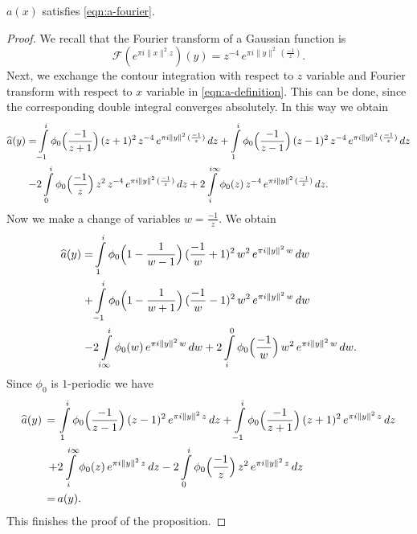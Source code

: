 \begin{proposition}\label{prop:a-fourier}
$a(x)$ satisfies \eqref{eqn:a-fourier}.
\end{proposition}
\begin{proof}
We recall that the Fourier transform of a Gaussian function is
\begin{equation}\label{eqn:gaussian Fourier}
    \mathcal{F}(e^{\pi i \|x\|^2 z})(y)=z^{-4}\,e^{\pi i \|y\|^2 \,(\frac{-1}{z}) }.
\end{equation}
Next, we exchange the contour integration with respect to $z$ variable and Fourier transform with respect to $x$ variable in \eqref{eqn:a-definition}.
This can be done, since the corresponding double integral converges absolutely. In this way we obtain
\begin{align}
    \widehat{a}(y)=&\int\limits_{-1}^i\phi_0\Big(\frac{-1}{z+1}\Big)\,(z+1)^2\,z^{-4}\,e^{\pi i \|y\|^2 \,(\frac{-1}{z})}\,dz
    +\int\limits_{1}^i\phi_0\Big(\frac{-1}{z-1}\Big)\,(z-1)^2\,z^{-4}\,e^{\pi i \|y\|^2 \,(\frac{-1}{z})}\,dz\notag \\
    -&2\int\limits_{0}^i\phi_0\Big(\frac{-1}{z}\Big)\,z^2\,z^{-4}\,e^{\pi i \|y\|^2 \,(\frac{-1}{z})}\,dz +2\int\limits_{i}^{i\infty}\phi_0(z)\,z^{-4}\,e^{\pi i \|y\|^2 \,(\frac{-1}{z})}\,dz.\notag
\end{align}
Now we make a change of variables $w=\frac{-1}{z}$. We obtain
\begin{align}
    \widehat{a}(y)=&\int\limits_{1}^i\phi_0\Big(1-\frac{1}{w-1}\Big)\,(\frac{-1}{w}+1)^2\,w^{2}\,e^{\pi i \|y\|^2 \,w}\,dw\notag\\
    +&\int\limits_{-1}^i\phi_0\Big(1-\frac{1}{w+1}\Big)\,(\frac{-1}{w}-1)^2\,w^2\,e^{\pi i \|y\|^2 \,w}\,dw\\
    -&2\int\limits_{i \infty}^i\phi_0(w)\,e^{\pi i \|y\|^2 \,w}\,dw +2\int\limits_{i}^{0}\phi_0\Big(\frac{-1}{w}\Big)\,w^{2}\,e^{\pi i \|y\|^2 \,w}\,dw.\notag
\end{align}
Since $\phi_0$ is $1$-periodic we have
\begin{align}
    \widehat{a}(y)\,=\,&\int\limits_{1}^i\phi_0\Big(\frac{-1}{z-1}\Big)\,(z-1)^2\,e^{\pi i \|y\|^2 \,z}\,dz
    +\int\limits_{-1}^i\phi_0\Big(\frac{-1}{z+1}\Big)\,(z+1)^2\,e^{\pi i \|y\|^2 \,z}\,dz\notag \\
    +&2\int\limits_{i}^{i\infty}\phi_0(z)\,e^{\pi i \|y\|^2 \,z}\,dz
    -2\int\limits_{0}^{i}\phi_0\Big(\frac{-1}{z}\Big)\,z^{2}\,e^{\pi i \|y\|^2 \,z}\,dz\notag \\
    \,=\,&a(y).
\end{align}
This finishes the proof of the proposition.
\end{proof}

